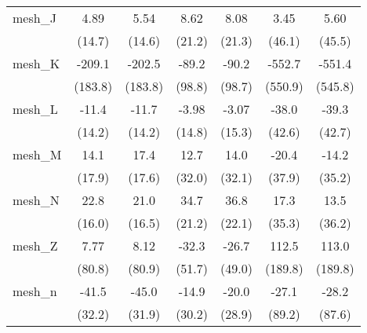 \begin{tabular}{lcccccc}
   mesh\_J                                                     & 4.89          & 5.54          & 8.62           & 8.08           & 3.45        & 5.60\\   
                                                               & (14.7)        & (14.6)        & (21.2)         & (21.3)         & (46.1)      & (45.5)\\   
   mesh\_K                                                     & -209.1        & -202.5        & -89.2          & -90.2          & -552.7      & -551.4\\   
                                                               & (183.8)       & (183.8)       & (98.8)         & (98.7)         & (550.9)     & (545.8)\\   
   mesh\_L                                                     & -11.4         & -11.7         & -3.98          & -3.07          & -38.0       & -39.3\\   
                                                               & (14.2)        & (14.2)        & (14.8)         & (15.3)         & (42.6)      & (42.7)\\   
   mesh\_M                                                     & 14.1          & 17.4          & 12.7           & 14.0           & -20.4       & -14.2\\   
                                                               & (17.9)        & (17.6)        & (32.0)         & (32.1)         & (37.9)      & (35.2)\\   
   mesh\_N                                                     & 22.8          & 21.0          & 34.7           & 36.8           & 17.3        & 13.5\\   
                                                               & (16.0)        & (16.5)        & (21.2)         & (22.1)         & (35.3)      & (36.2)\\   
   mesh\_Z                                                     & 7.77          & 8.12          & -32.3          & -26.7          & 112.5       & 113.0\\   
                                                               & (80.8)        & (80.9)        & (51.7)         & (49.0)         & (189.8)     & (189.8)\\   
   mesh\_n                                                     & -41.5         & -45.0         & -14.9          & -20.0          & -27.1       & -28.2\\   
                                                               & (32.2)        & (31.9)        & (30.2)         & (28.9)         & (89.2)      & (87.6)\\   

\end{tabular}
